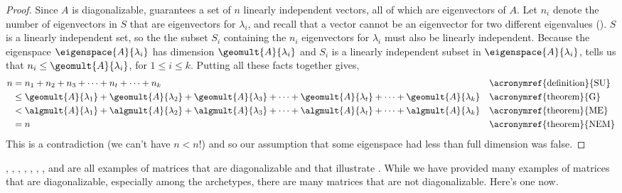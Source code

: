 \begin{proof}
%
Since $A$ is diagonalizable,  guarantees a set of $n$ linearly independent vectors, all of which are eigenvectors of $A$.  Let $n_i$ denote the number of eigenvectors in $S$ that are eigenvectors for $\lambda_i$, and recall that a vector cannot be an eigenvector for two different eigenvalues ().  $S$ is a linearly independent set, so the the subset $S_i$ containing the $n_i$ eigenvectors for $\lambda_i$ must also be linearly independent.  Because the eigenspace $\eigenspace{A}{\lambda_i}$ has dimension $\geomult{A}{\lambda_i}$ and $S_i$ is a linearly independent subset in $\eigenspace{A}{\lambda_i}$,  tells us that $n_i\leq\geomult{A}{\lambda_i}$, for $1\leq i\leq k$.
Putting all these facts together gives,
%
\begin{align*}
n
&=n_1+n_2+n_3+\cdots+n_t+\cdots+n_k
&&\text{\acronymref{definition}{SU}}\\
%
&\leq\geomult{A}{\lambda_1}+\geomult{A}{\lambda_2}+\geomult{A}{\lambda_3}+\cdots+\geomult{A}{\lambda_t}+\cdots+\geomult{A}{\lambda_k}
&&\text{\acronymref{theorem}{G}}\\
%
&<\algmult{A}{\lambda_1}+\algmult{A}{\lambda_2}+\algmult{A}{\lambda_3}+\cdots+\algmult{A}{\lambda_t}+\cdots+\algmult{A}{\lambda_k}&&\text{\acronymref{theorem}{ME}}\\
%
&=n
&&\text{\acronymref{theorem}{NEM}}
%
\end{align*}
%
This is a contradiction (we can't have $n<n$!) and so our assumption that some eigenspace had less than full dimension was false.
%
\end{proof}
%
,
,
,
,
,
,
,
 and
are all examples of matrices that are diagonalizable and that illustrate .  While we have provided many examples of matrices that are diagonalizable, especially among the archetypes, there are many matrices that are not diagonalizable.  Here's one now.
%
